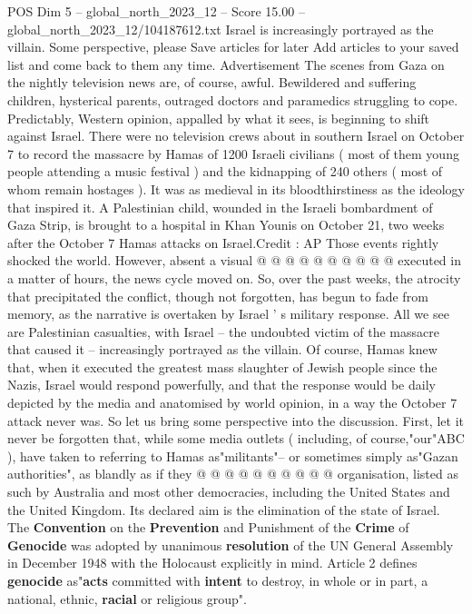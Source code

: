 \begin{textsample}{POS Dim 5 – global\_north\_2023\_12 – Score 15.00 – global\_north\_2023\_12/104187612.txt}  \label{ex:f5_pos_344}
Israel is increasingly portrayed as the villain.
Some perspective, please Save articles for later Add articles to your saved list and come back to them any time.
Advertisement The scenes from Gaza on the nightly television news are, of course, awful.
Bewildered and suffering children, hysterical parents, outraged doctors and paramedics struggling to cope.
Predictably, Western opinion, appalled by what it sees, is beginning to shift against Israel.
There were no television crews about in southern Israel on October 7 to record the massacre by Hamas of 1200 Israeli civilians ( most of them young people attending a music festival ) and the kidnapping of 240 others ( most of whom remain hostages ).
It was as medieval in its bloodthirstiness as the ideology that inspired it.
A Palestinian child, wounded in the Israeli bombardment of Gaza Strip, is brought to a hospital in Khan Younis on October 21, two weeks after the October 7 Hamas attacks on Israel.Credit : AP Those events rightly shocked the world.
However, absent a visual @ @ @ @ @ @ @ @ @ @ executed in a matter of hours, the news cycle moved on.
So, over the past weeks, the atrocity that precipitated the conflict, though not forgotten, has begun to fade from memory, as the narrative is overtaken by Israel ' s military response.
All we see are Palestinian casualties, with Israel -- the undoubted victim of the massacre that caused it -- increasingly portrayed as the villain.
Of course, Hamas knew that, when it executed the greatest mass slaughter of Jewish people since the Nazis, Israel would respond powerfully, and that the response would be daily depicted by the media and anatomised by world opinion, in a way the October 7 attack never was.
So let us bring some perspective into the discussion.
First, let it never be forgotten that, while some media outlets ( including, of course,"our"ABC ), have taken to referring to Hamas as"militants"-- or sometimes simply as"Gazan authorities", as blandly as if they @ @ @ @ @ @ @ @ @ @ organisation, listed as such by Australia and most other democracies, including the United States and the United Kingdom.
Its declared aim is the elimination of the state of Israel.
The \textbf{Convention} on the \textbf{Prevention} and Punishment of the \textbf{Crime} of \textbf{Genocide} was adopted by unanimous \textbf{resolution} of the UN General Assembly in December 1948 with the Holocaust explicitly in mind.
Article 2 defines \textbf{genocide} as"\textbf{acts} committed with \textbf{intent} to destroy, in whole or in part, a national, ethnic, \textbf{racial} or religious group".

\end{textsample}
